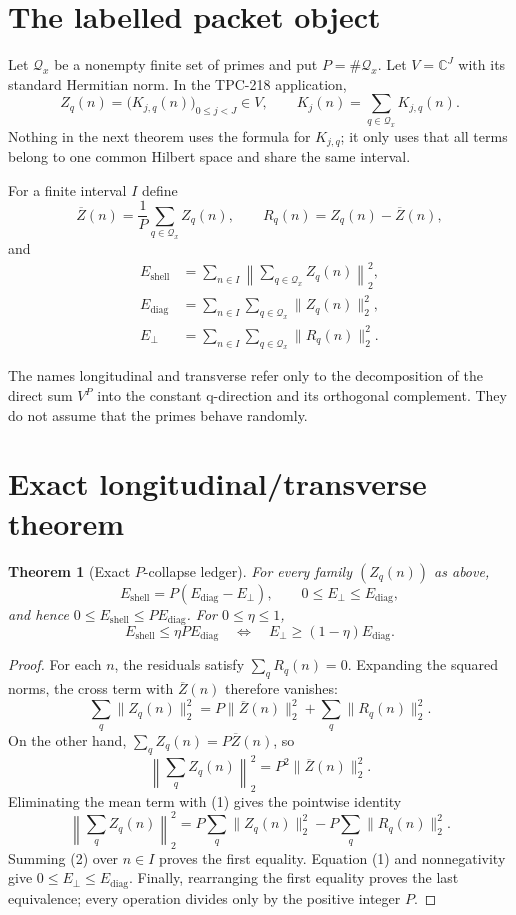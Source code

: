 \documentclass[11pt]{article}
\newtheorem{theorem}{Theorem}
\newcommand{\Qx}{\mathcal Q_x}
\newcommand{\Ediag}{E_{\mathrm{diag}}}
\newcommand{\Eperp}{E_{\perp}}
\newcommand{\Eshell}{E_{\mathrm{shell}}}
\newcommand{\Zbar}{\overline Z}
\begin{document}
\section{The labelled packet object}

Let $\Qx$ be a nonempty finite set of primes and put $P=\#\Qx$.  Let
$V=\mathbb C^J$ with its standard Hermitian norm.  In the TPC-218 application,
\[
 Z_q(n)=\bigl(K_{j,q}(n)\bigr)_{0\leq j<J}\in V,
 \qquad K_j(n)=\sum_{q\in\Qx}K_{j,q}(n).
\]
Nothing in the next theorem uses the formula for $K_{j,q}$; it only uses that all terms
belong to one common Hilbert space and share the same interval.

For a finite interval $I$ define
\[
 \Zbar(n)=\frac1P\sum_{q\in\Qx}Z_q(n),\qquad
 R_q(n)=Z_q(n)-\Zbar(n),
\]
and
\begin{align*}
 \Eshell&=\sum_{n\in I}\left\|\sum_{q\in\Qx}Z_q(n)\right\|_2^2,\\
 \Ediag&=\sum_{n\in I}\sum_{q\in\Qx}\|Z_q(n)\|_2^2,\\
 \Eperp&=\sum_{n\in I}\sum_{q\in\Qx}\|R_q(n)\|_2^2.
\end{align*}

The names longitudinal and transverse refer only to the decomposition of the direct sum
$V^P$ into the constant q-direction and its orthogonal complement.  They do not assume
that the primes behave randomly.

\section{Exact longitudinal/transverse theorem}

\begin{theorem}[Exact $P$-collapse ledger]
For every family $(Z_q(n))$ as above,
\[
 \Eshell=P(\Ediag-\Eperp),\qquad
 0\leq \Eperp\leq\Ediag,
\]
and hence $0\leq\Eshell\leq P\Ediag$.
For $0\leq\eta\leq1$,
\[
 \Eshell\leq\eta P\Ediag
 \quad\Longleftrightarrow\quad
 \Eperp\geq(1-\eta)\Ediag.
\]
\end{theorem}

\begin{proof}
For each $n$, the residuals satisfy $\sum_qR_q(n)=0$. Expanding the squared norms,
the cross term with $\Zbar(n)$ therefore vanishes:
\[
 \sum_q\|Z_q(n)\|_2^2
 =P\|\Zbar(n)\|_2^2+\sum_q\|R_q(n)\|_2^2. \tag{1}
\]
On the other hand, $\sum_qZ_q(n)=P\Zbar(n)$, so
\[
 \left\|\sum_qZ_q(n)\right\|_2^2=P^2\|\Zbar(n)\|_2^2.
\]
Eliminating the mean term with (1) gives the pointwise identity
\[
 \left\|\sum_qZ_q(n)\right\|_2^2
 =P\sum_q\|Z_q(n)\|_2^2-P\sum_q\|R_q(n)\|_2^2. \tag{2}
\]
Summing (2) over $n\in I$ proves the first equality.  Equation (1) and nonnegativity
give $0\leq\Eperp\leq\Ediag$.  Finally, rearranging the first equality proves the
last equivalence; every operation divides only by the positive integer $P$.
\end{proof}
\end{document}
